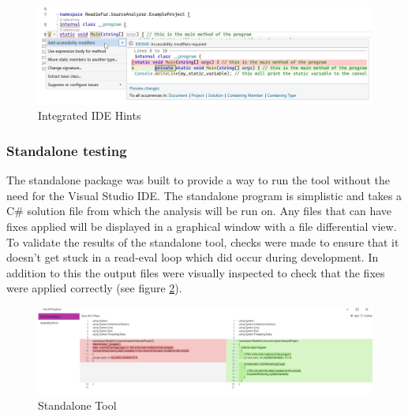 \begin{figure}[H]
    \vspace{-10px}
    \centering
    \caption{Integrated IDE Hints}
    \label{fig:IDEHints}
    \includegraphics[width=\textwidth]{Figures/IDEHintsCropped.png}
\end{figure}

\subsubsection{Standalone testing}
The standalone package was built to provide a way to run the tool without the need for the Visual Studio IDE. The standalone program is simplistic and takes a C\# solution file from which the analysis will be run on. Any files that can have fixes applied will be displayed in a graphical window with a file differential view. To validate the results of the standalone tool, checks were made to ensure that it doesn't get stuck in a read-eval loop which did occur during development. In addition to this the output files were visually inspected to check that the fixes were applied correctly (see figure \ref{fig:StandaloneTool}).

\begin{figure}[H]
    \centering
    \caption{Standalone Tool}
    \label{fig:StandaloneTool}
    \includegraphics[width=\textwidth]{Figures/StandaloneToolCropped.png}
\end{figure}
